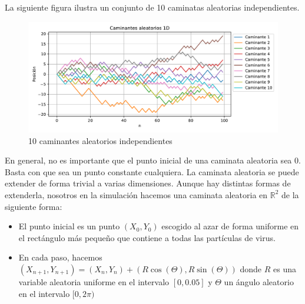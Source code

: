 \documentclass[11pt]{article}
\begin{document}
La siguiente figura ilustra un conjunto de 10 caminatas aleatorias independientes.
\begin{figure}[h]
    \centering
    \includegraphics[width=\textwidth]{caminantes.pdf}
    \caption{10 caminantes aleatorios independientes}
\end{figure}
En general, no es importante que el punto inicial de una caminata aleatoria sea 0. Basta con que sea un punto constante cualquiera. La caminata aleatoria se puede extender de forma trivial a varias dimensiones. Aunque hay distintas formas de extenderla, nosotros en la simulación hacemos una caminata aleatoria en $\mathbb{R}^2$ de la siguiente forma: 
\begin{itemize}
    \item El punto inicial es un punto $(X_0,Y_0)$ escogido al azar de forma uniforme en el rectángulo más pequeño que contiene a todas las partículas de virus.
    \item En cada paso, hacemos $(X_{n+1},Y_{n+1}) = (X_n,Y_n) + (R\cos(\Theta),R\sin(\Theta))$ donde $R$ es una variable aleatoria uniforme en el intervalo $[0,0.05]$ y $\Theta$ un ángulo aleatorio en el intervalo $[0,2\pi)$
\end{itemize}
\end{document}
